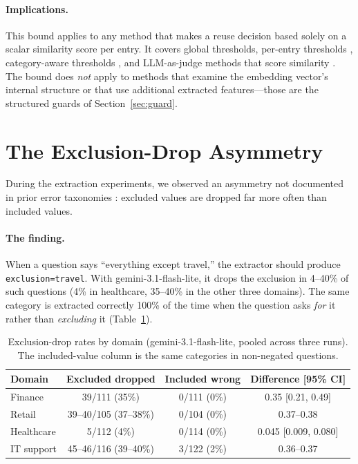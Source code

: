 \documentclass[11pt,a4paper]{article}
\begin{document}
\paragraph{Implications.} This bound applies to any method that makes a
reuse decision based solely on a scalar similarity score per entry. It
covers global thresholds, per-entry thresholds
\cite{schroeder2026vcache}, category-aware thresholds
\cite{wang2025category}, and LLM-as-judge methods that score similarity
\cite{singh2026krites}. The bound does \emph{not} apply to methods that
examine the embedding vector's internal structure or that use additional
extracted features---those are the structured guards of
Section~\ref{sec:guard}.

\section{The Exclusion-Drop Asymmetry}
\label{sec:exclusion}

During the extraction experiments, we observed an asymmetry not documented
in prior error taxonomies \cite{rathore2026cogni, bindschaedler2026semantic,
jivani2026tecod}: excluded values are dropped far more often than included
values.

\paragraph{The finding.} When a question says ``everything except travel,''
the extractor should produce \texttt{exclusion=travel}. With
gemini-3.1-flash-lite, it drops the exclusion in 4--40\% of such
questions (4\% in healthcare, 35--40\% in the other three domains). The same category is extracted correctly 100\% of the time when
the question asks \emph{for} it rather than \emph{excluding} it
(Table~\ref{tab:exclusion}).

\begin{table}[t]
\centering
\caption{Exclusion-drop rates by domain (gemini-3.1-flash-lite, pooled
across three runs). The included-value column is the same categories in
non-negated questions.}
\label{tab:exclusion}
\small
\begin{tabular}{@{}lccc@{}}
\toprule
Domain & Excluded dropped & Included wrong & Difference [95\% CI] \\
\midrule
Finance     & 39/111 (35\%) & 0/111 (0\%) & 0.35 [0.21, 0.49] \\
Retail      & 39--40/105 (37--38\%) & 0/104 (0\%) & 0.37--0.38 \\
Healthcare  & 5/112 (4\%)  & 0/114 (0\%) & 0.045 [0.009, 0.080] \\
IT support  & 45--46/116 (39--40\%) & 3/122 (2\%) & 0.36--0.37 \\
\bottomrule
\end{tabular}
\end{table}
\end{document}
